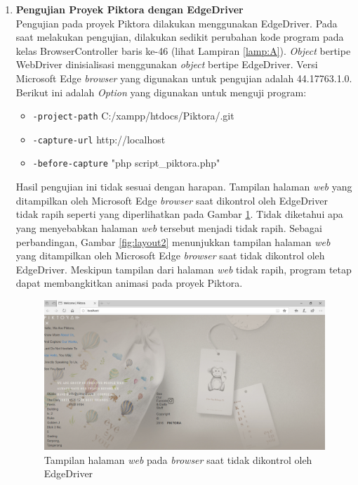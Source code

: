\begin{enumerate}
\item \textbf{Pengujian Proyek Piktora dengan EdgeDriver}\\
Pengujian pada proyek Piktora dilakukan menggunakan EdgeDriver. Pada saat melakukan pengujian, dilakukan sedikit perubahan kode program pada kelas BrowserController baris ke-46 (lihat Lampiran \ref{lamp:A}). \textit{Object} bertipe WebDriver dinisialisasi menggunakan \textit{object} bertipe EdgeDriver. Versi Microsoft Edge \textit{browser} yang digunakan untuk pengujian adalah 44.17763.1.0. Berikut ini adalah \textit{Option} yang digunakan untuk menguji program:
\begin{itemize}
\item \texttt{-project-path} C:/xampp/htdocs/Piktora/.git
\item \texttt{-capture-url} http://localhost
\item \texttt{-before-capture} "php script\_piktora.php"
\end{itemize}
Hasil pengujian ini tidak sesuai dengan harapan. Tampilan halaman \textit{web} yang ditampilkan oleh Microsoft Edge \textit{browser} saat dikontrol oleh EdgeDriver tidak rapih seperti yang diperlihatkan pada Gambar \ref{fig:layout1}. Tidak diketahui apa yang menyebabkan halaman \textit{web} tersebut menjadi tidak rapih. Sebagai perbandingan, Gambar \ref{fig:layout2} menunjukkan tampilan halaman \textit{web} yang ditampilkan oleh Microsoft Edge \textit{browser} saat tidak dikontrol oleh EdgeDriver. Meskipun tampilan dari halaman \textit{web} tidak rapih, program tetap dapat membangkitkan animasi pada proyek Piktora.    

\begin{figure}[H]
	\centering
		\includegraphics[scale=0.4]{Gambar/Layout_dengan_Edge_Driver.png}
	\caption{Tampilan halaman \textit{web} pada \textit{browser} saat tidak dikontrol oleh EdgeDriver}
	\label{fig:layout1}
\end{figure}


\end{enumerate}
